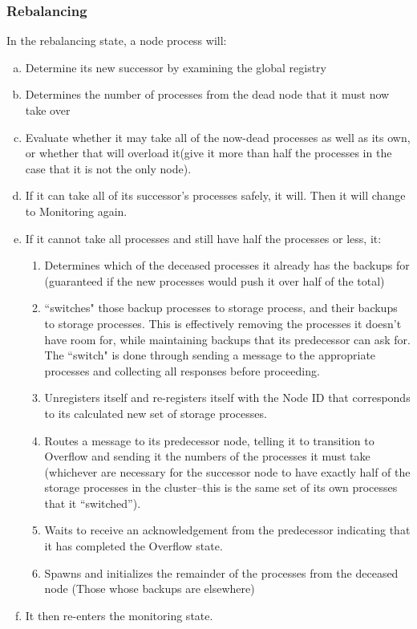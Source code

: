 \documentclass[a4paper]{article}
\begin{document}
\subsubsection{Rebalancing}

In the rebalancing state, a node process will:
\begin{enumerate}[a.]
\item Determine its new successor by examining the global registry
\item Determines the number of processes from the dead node that it must now take over
\item Evaluate whether it may take all of the now-dead processes as well as its own, or whether that will overload it(give it more than half the processes in the case that it is not the only node).
\item If it can take all of its successor's processes safely, it will. Then it will change to Monitoring again.
\item If it cannot take all processes and still have half the processes or less, it:
\begin{enumerate}
\item Determines which of the deceased processes it already has the backups for (guaranteed if the new processes would push it over half of the total)
\item ``switches" those backup processes to storage process, and their backups to storage processes. This is effectively removing the processes it doesn't have room for, while maintaining backups that its predecessor can ask for. The ``switch" is done through sending a message to the appropriate processes and collecting all responses before proceeding.
\item Unregisters itself and re-registers itself with the Node ID that corresponds to its calculated new set of storage processes.
\item Routes a message to its predecessor node, telling it to transition to Overflow and sending it the numbers of the processes it must take (whichever are necessary for the successor node to have exactly half of the storage processes in the cluster--this is the same set of its own processes that it ``switched'').
\item Waits to receive an acknowledgement from the predecessor indicating that it has completed the Overflow state.
\item Spawns and initializes the remainder of the processes from the deceased node (Those whose backups are elsewhere)
\end{enumerate}
\item It then re-enters the monitoring state.
\end{enumerate}
\end{document}
